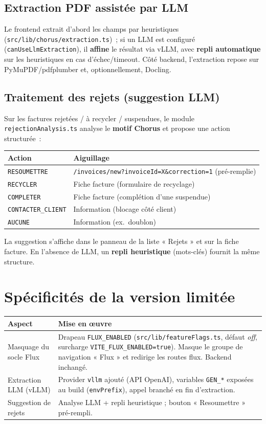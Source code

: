 \documentclass[11pt,a4paper]{article}
\newcommand{\code}[1]{\texttt{\small #1}}
\begin{document}
\subsection{Extraction PDF assistée par LLM}
Le frontend extrait d'abord les champs par heuristiques
(\code{src/lib/chorus/extraction.ts})~; si un LLM est configuré
(\code{canUseLlmExtraction}), il \textbf{affine} le résultat via vLLM, avec
\textbf{repli automatique} sur les heuristiques en cas d'échec/timeout. Côté
backend, l'extraction repose sur PyMuPDF/pdfplumber et, optionnellement, Docling.

\subsection{Traitement des rejets (suggestion LLM)}
Sur les factures rejetées / à recycler / suspendues, le module
\code{rejectionAnalysis.ts} analyse le \textbf{motif Chorus} et propose une action
structurée~:
\begin{center}
\begin{tabular}{ll}
\toprule
\textbf{Action} & \textbf{Aiguillage} \\
\midrule
\code{RESOUMETTRE} & \code{/invoices/new?invoiceId=X\&correction=1} (pré-remplie) \\
\code{RECYCLER} & Fiche facture (formulaire de recyclage) \\
\code{COMPLETER} & Fiche facture (complétion d'une suspendue) \\
\code{CONTACTER\_CLIENT} & Information (blocage côté client) \\
\code{AUCUNE} & Information (ex.~doublon) \\
\bottomrule
\end{tabular}
\end{center}
La suggestion s'affiche dans le panneau de la liste « Rejets » et sur la fiche
facture. En l'absence de LLM, un \textbf{repli heuristique} (mots-clés) fournit
la même structure.

\section{Spécificités de la version limitée}

\begin{longtable}{p{4cm} p{11cm}}
\toprule
\textbf{Aspect} & \textbf{Mise en œuvre} \\
\midrule
\endhead
Masquage du socle Flux & Drapeau \code{FLUX\_ENABLED} (\code{src/lib/featureFlags.ts}, défaut \emph{off}, surcharge \code{VITE\_FLUX\_ENABLED=true}). Masque le groupe de navigation « Flux » et redirige les routes flux. Backend inchangé. \\
Extraction LLM (vLLM) & Provider \code{vllm} ajouté (API OpenAI), variables \code{GEN\_*} exposées au build (\code{envPrefix}), appel branché en fin d'extraction. \\
Suggestion de rejets & Analyse LLM + repli heuristique ; bouton « Resoumettre » pré-rempli. \\
\bottomrule
\end{longtable}
\end{document}
